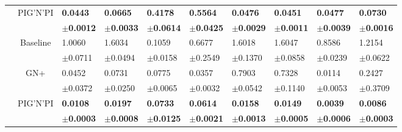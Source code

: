 \documentclass{article}
\newcommand{\pignpi}{PIG'N'PI\xspace}
\newcommand{\lemos}{GN+\xspace}
\begin{document}
\begin{table}[h!]
{\begin{tabularx}{\textwidth}{ccXXXXXXXX}
        &\multirow{2}{*}{\pignpi}
        & \textbf{0.0443} & \textbf{0.0665} & \textbf{0.4178} & \textbf{0.5564} & \textbf{0.0476} & \textbf{0.0451} & \textbf{0.0477} & \textbf{0.0730}\\
        && \scriptsize \textbf{$\pm$0.0012} & \scriptsize \textbf{$\pm$0.0033} & \scriptsize \textbf{$\pm$0.0614} & \scriptsize \textbf{$\pm$0.0425} & \scriptsize \textbf{$\pm$0.0029} & \scriptsize \textbf{$\pm$0.0011} & \scriptsize \textbf{$\pm$0.0039} & \scriptsize \textbf{$\pm$0.0016}\\
        \hline\rule{0pt}{2.3ex}
        
        \multirow{6}{*}{$\textsf{MAE}_\textsf{symm}^{F}$}
        &\multirow{2}{*}{Baseline} 
        & 1.0060 & 1.6034 & 0.1059 & 0.6677 & 1.6018 & 1.6047 & 0.8586 & 1.2154 \\
        &&\scriptsize$\pm$0.0711 & \scriptsize $\pm$0.0494 & \scriptsize $\pm$0.0158 & \scriptsize $\pm$0.2549 & \scriptsize $\pm$0.1370 & \scriptsize $\pm$0.0858 & \scriptsize $\pm$0.0239 & \scriptsize $\pm$0.0622\\
        \cline{3-10}\rule{0pt}{2.3ex}
        
        &\multirow{2}{*}{\lemos}
        &0.0452 & 0.0731 & 0.0775 & 0.0357 & 0.7903 & 0.7328 & 0.0114 & 0.2427\\
        &&\scriptsize$\pm$0.0372&\scriptsize$\pm$0.0250&\scriptsize$\pm$0.0065&\scriptsize$\pm$0.0032&\scriptsize$\pm$0.0542&\scriptsize$\pm$0.1140&\scriptsize$\pm$0.0053&\scriptsize$\pm$0.3709\\
        \cline{3-10}\rule{0pt}{2.3ex}

        &\multirow{2}{*}{\pignpi}
        & \textbf{0.0108} & \textbf{0.0197} & \textbf{0.0733} & \textbf{0.0614} & \textbf{0.0158} & \textbf{0.0149} & \textbf{0.0039} & \textbf{0.0086}\\
        && \scriptsize \textbf{$\pm$0.0003} & \scriptsize \textbf{$\pm$0.0008} & \scriptsize \textbf{$\pm$0.0125} & \scriptsize \textbf{$\pm$0.0021} & \scriptsize \textbf{$\pm$0.0013} & \scriptsize \textbf{$\pm$0.0005} & \scriptsize \textbf{$\pm$0.0006} & \scriptsize \textbf{$\pm$0.0003}\\
        
      \bottomrule
\end{tabularx}
}
\end{table}
\end{document}
